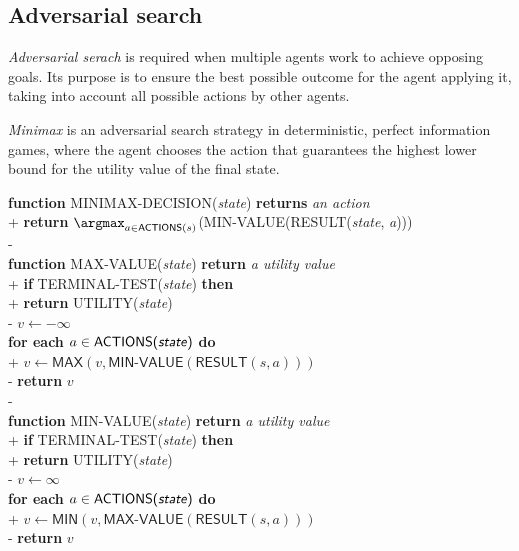 \documentclass{article}
\begin{document}
\subsection{Adversarial search}


\begin{definition}[R\&N p. 161]
    \emph{Adversarial serach} is required when multiple agents work to achieve 
    opposing goals. Its purpose is to ensure the best possible outcome for the
    agent applying it, taking into account all possible actions by other agents.
\end{definition}

\begin{definition}[R\&N p. 165]
    \emph{Minimax} is an adversarial search strategy in deterministic, perfect
    information games, where the agent chooses the action that guarantees the
    highest lower bound for the utility value of the final state.

    \begin{pseudo}
        \textbf{function} MINIMAX-DECISION(\emph{state}) \textbf{returns} \emph{an action}\\+
            \textbf{return} $\argmax_{a\in\textsf{ACTIONS}(s)}$(MIN-VALUE(RESULT(\emph{state}, \emph{a})))\\-
        \\
        \textbf{function} MAX-VALUE(\emph{state}) \textbf{return} \emph{a utility value}\\+
            \textbf{if} TERMINAL-TEST(\emph{state}) \textbf{then}\\+
                \textbf{return} UTILITY(\emph{state})\\-
            $v\leftarrow-\infty$\\
            \textbf{for each} $a\in\textsf{ACTIONS(\emph{state})}$ \textbf{do}\\+
                $v\leftarrow \textsf{MAX}(v, \textsf{MIN-VALUE}(\textsf{RESULT}(s, a)))$\\-
            \textbf{return} $v$\\-
        \\
        \textbf{function} MIN-VALUE(\emph{state}) \textbf{return} \emph{a utility value}\\+
            \textbf{if} TERMINAL-TEST(\emph{state}) \textbf{then}\\+
                \textbf{return} UTILITY(\emph{state})\\-
            $v\leftarrow\infty$\\
            \textbf{for each} $a\in\textsf{ACTIONS(\emph{state})}$ \textbf{do}\\+
                $v\leftarrow \textsf{MIN}(v, \textsf{MAX-VALUE}(\textsf{RESULT}(s, a)))$\\-
            \textbf{return} $v$
    \end{pseudo}
\end{definition}
\end{document}
